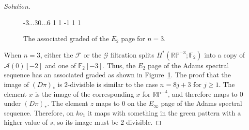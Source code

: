 \documentclass{amsart}
\def\RP{\mathbb{RP}}
\def\Filt{\mathcal{F}}
\def\Gilt{\mathcal{G}}
\newcommand{\Steenrod}{\mathcal{A}}
\newcommand{\Azero}{\Steenrod(0)}
\newcommand{\FF}{\mathbb{F}}
\begin{document}
\begin{proof}[Solution]
\begin{figure}
\begin{sseq}[entrysize=5mm, gridstroke=.05pt]{-3...3}{0...6}
\ssdropbull
{} 1
\ssdropbull \ssstroke[color=red]
 1
\ssdropbull \ssstroke[color=red]
 {-1}
\ssdropbull \ssstroke[color=red]
 1
\ssdropbull {} \ssstroke[color=red]
 1
\ssdropbull \ssstroke[color=red]

\end{sseq}
\caption{The associated graded of the $E_2$ page for $n=3$.}
\label{fig:RP3}
\end{figure}

When $n=3$, either the $\Filt$ or the $\Gilt$ filtration splits
$H^*(\RP^{-3}; \FF_2)$ into a copy of $\Azero[-2]$ and one of
$\FF_2[-3]$. Thus, the $E_2$ page of the Adams spectral sequence has
an associated graded as shown in Figure~\ref{fig:RP3}.  The proof that
the image of $(D\pi)_*$ is $2$-divisible is similar to the case
$n=8j+3$ for $j \geq 1$. The element $x$ is the image of the
corresponding $x$ for $\RP^{-4}$, and therefore maps to $0$ under
$(D\pi)_*$. The element $z$ maps to $0$ on the $E_{\infty}$ page of
the Adams spectral sequence. Therefore, on $ko_1$ it maps with
something in the green pattern with a higher value of $s$, so its
image must be $2$-divisible.
\end{proof}



\end{document}
